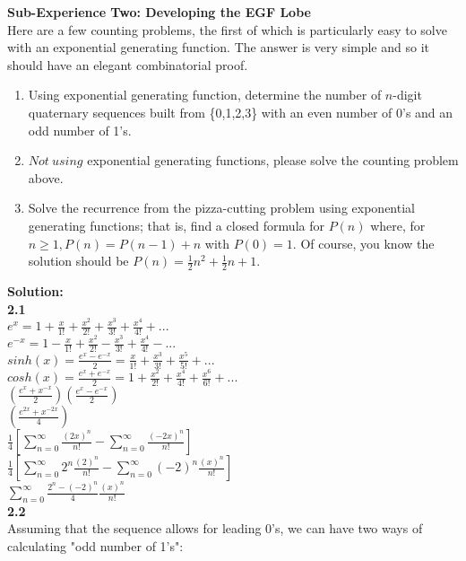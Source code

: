\documentclass[10pt,a4paper]{report}
\begin{document}
	\textbf{Sub-Experience Two: Developing the EGF Lobe}\\
	Here are a few counting problems, the first of which is particularly easy to solve with an exponential generating function.  The answer is very simple and so it should have an elegant combinatorial proof.
	\begin{enumerate}
		\item Using exponential generating function, determine the number of $n$-digit quaternary sequences built from \{0,1,2,3\} with an even number of 0's and an odd number of 1's.
		\item $Not\ using$ exponential generating functions, please solve the counting problem above.
		\item Solve the recurrence from the pizza-cutting problem using exponential generating functions; that is, find a closed formula for $P(n)$ where, for $n\geq1, P(n) = P(n-1) + n$ with $P(0) = 1$.  Of course, you know the solution should be $P(n) = \frac{1}{2}n^2 + \frac{1}{2}n + 1$.
	\end{enumerate}
	\textbf{Solution: }\\
	\newline
	\textbf{2.1}\\
	$e^x = 1 + \frac{x}{1!} + \frac{x^2}{2!} + \frac{x^3}{3!} + \frac{x^4}{4!} + ...$\\ 
	$e^{-x} = 1 - \frac{x}{1!} + \frac{x^2}{2!} - \frac{x^3}{3!} + \frac{x^4}{4!} - ...$\\
	$sinh(x) = \frac{e^x - e^{-x}}{2} = \frac{x}{1!} + \frac{x^3}{3!} + \frac{x^5}{5!} + ...$\\
	$cosh(x) = \frac{e^x + e^{-x}}{2} = 1 + \frac{x^2}{2!} + \frac{x^4}{4!} + \frac{x^6}{6!} + ...$\\
	$(\frac{e^x + x^{-x}}{2})(\frac{e^x - e^{-x}}{2}) $\\
	$(\frac{e^{2x} + x^{-2x}}{4})$\\
	$\frac{1}{4}[\sum_{n=0}^{\infty}\frac{(2x)^n}{n!} - \sum_{n=0}^{\infty}\frac{(-2x)^n}{n!}]$\\
	$\frac{1}{4}[\sum_{n=0}^{\infty}2^n\frac{(2)^n}{n!} - \sum_{n=0}^{\infty}(-2)^n\frac{(x)^n}{n!}]$\\
	$\sum_{n=0}^{\infty}\frac{2^n-(-2)^n}{4}\frac{(x)^n}{n!}$\\
	\textbf{2.2}\\
	Assuming that the sequence allows for leading 0's, we can have two ways of calculating "odd number of 1's":
\end{document}
